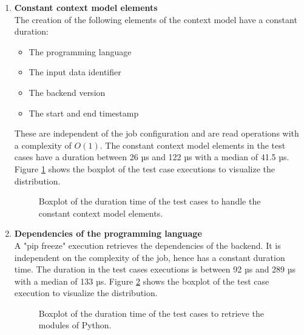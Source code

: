 \documentclass[draft,final]{vutinfth} %
\begin{document}
\begin{enumerate}
	\item \textbf{Constant context model elements} \\
	The creation of the following elements of the context model have a constant duration: 
	\begin{itemize}
		\item The programming language
		\item The input data identifier
		\item The backend version
		\item The start and end timestamp
	\end{itemize}
	These are independent of the job configuration and are read operations with a complexity of $O(1)$. The constant context model elements in the test cases have a duration between 26 µs and 122 µs with a median of 41.5 µs. Figure \ref{fig:evaluation_perf_static_cm} shows the boxplot of the test case executions to visualize the distribution.
	\begin{figure}[!h]
		\centering
		\caption{Boxplot of the duration time of the test cases to handle the constant context model elements.}
		\label{fig:evaluation_perf_static_cm}		
	\end{figure}

	\item \textbf{Dependencies of the programming language} \\
	A "pip freeze" execution retrieves the dependencies of the backend. It is independent on the complexity of the job, hence has a constant duration time. The duration in the test cases executions is between 92 µs and 289 µs with a median of 133 µs. Figure \ref{fig:evaluation_perf_python} shows the boxplot of the test case execution to visualize the distribution.
	\begin{figure}[!h]
		\centering
		\caption{Boxplot of the duration time of the test cases to retrieve the modules of Python.}
		\label{fig:evaluation_perf_python}		
	\end{figure}


\end{enumerate}
\end{document}
